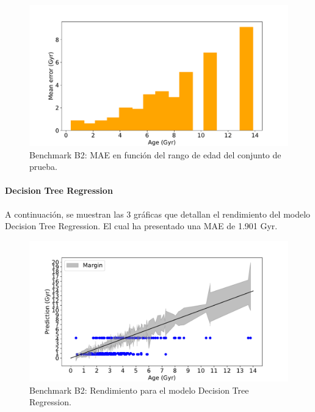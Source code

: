 \begin{figure}[H]
\begin{center}
 \includegraphics[width=0.8\linewidth]{Figuras/Experimentos/B_B2_svm_3.pdf}
\end{center}
\caption{Benchmark B2: MAE en función del rango de edad del conjunto de prueba.}
 \label{fig:benchB2_details_svm_3}
\end{figure}

\paragraph{Decision Tree Regression} 
A continuación, se muestran las 3 gráficas que detallan el rendimiento del modelo Decision Tree Regression. El cual ha presentado una MAE de 1.901 Gyr.

\begin{figure}[H]
\begin{center}
 \includegraphics[width=0.8\linewidth]{Figuras/Experimentos/B_B2_dtr_1.pdf}
\end{center}
\caption{Benchmark B2: Rendimiento para el modelo Decision Tree Regression.}
 \label{fig:benchB2_details_dtr_1}
\end{figure}

